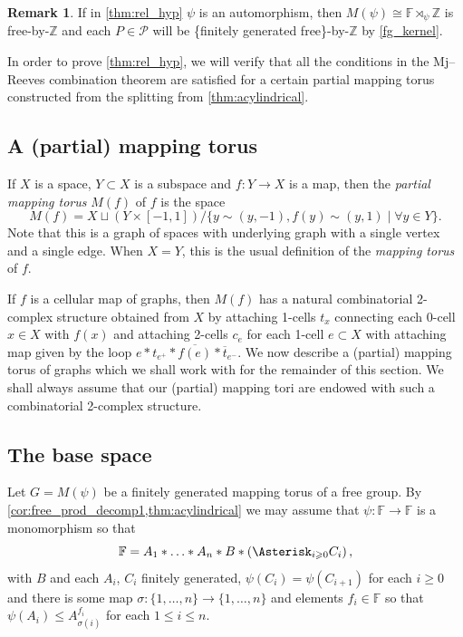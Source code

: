 \documentclass[11pt, a4paper]{amsart}
\theoremstyle{definition}
\newtheorem{remark}[theorem]{Remark}
\newcommand{\F}{\mathbb{F}}
\newcommand{\Z}{\mathbb{Z}}
\begin{document}
\begin{remark}
If in \cref{thm:rel_hyp} $\psi$ is an automorphism, then $M(\psi)\cong \F\rtimes_{\psi}\Z$ is free-by-$\Z$ and each $P\in \mathcal{P}$ will be \{finitely generated free\}-by-$\Z$  by \cref{fg_kernel}.
\end{remark}

In order to prove \cref{thm:rel_hyp}, we will verify that all the conditions in the Mj--Reeves combination theorem are satisfied for a certain partial mapping torus constructed from the splitting from \cref{thm:acylindrical}.


\subsection{A (partial) mapping torus}
\label{sec:mapping_torus}

If $X$ is a space, $Y\subset X$ is a subspace and $f\colon Y\to X$ is a map, then the \emph{partial mapping torus} $M(f)$ of $f$ is the space
\[
M(f) = X\sqcup \left(Y\times[-1, 1]\right)/ \{y \sim (y, -1), f(y) \sim (y, 1) \mid \forall y\in Y\}.
\]
Note that this is a graph of spaces with underlying graph with a single vertex and a single edge. When $X = Y$, this is the usual definition of the \emph{mapping torus} of $f$.

If $f$ is a cellular map of graphs, then $M(f)$ has a natural combinatorial 2-complex structure obtained from $X$ by attaching 1-cells $t_x$ connecting each 0-cell $x\in X$ with $f(x)$ and attaching 2-cells $c_e$ for each 1-cell $e\subset X$ with attaching map given by the loop $e*t_{e^+}*\overline{f(e)}*\overline{t}_{e^-}$. We now describe a (partial) mapping torus of graphs which we shall work with for the remainder of this section. We shall always assume that our (partial) mapping tori are endowed with such a combinatorial 2-complex structure.


\subsection*{The base space}

Let $G = M(\psi)$ be a finitely generated mapping torus of a free group. By \cref{cor:free_prod_decomp1,thm:acylindrical} we may assume that $\psi\colon \F \to \F$ is a monomorphism so that
\[
\F = A_1*\ldots*A_n*B*\left(\Asterisk_{i\geqslant 0}C_i\right),
\]
with $B$ and each $A_i$, $C_i$ finitely generated, $\psi(C_i) = \psi(C_{i+1})$ for each $i\geqslant 0$ and there is some map $\sigma\colon\{1, \ldots, n\}\to\{1, \ldots, n\}$ and elements $f_i\in \F$ so that $\psi(A_i) \leqslant A_{\sigma(i)}^{f_i}$ for each $1\leqslant i\leqslant n$.
\end{document}
